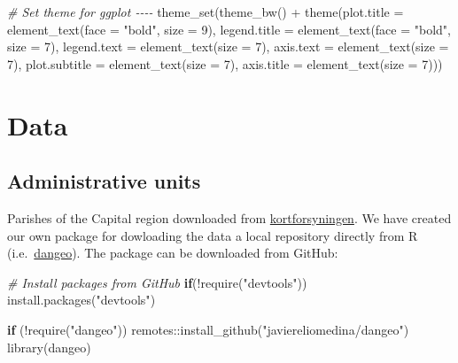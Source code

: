 \documentclass[
  12pt,
]{article}
\newenvironment{Shaded}{\begin{snugshade}}{\end{snugshade}}
\newcommand{\AttributeTok}[1]{\textcolor[rgb]{0.77,0.63,0.00}{#1}}
\newcommand{\CommentTok}[1]{\textcolor[rgb]{0.56,0.35,0.01}{\textit{#1}}}
\newcommand{\ControlFlowTok}[1]{\textcolor[rgb]{0.13,0.29,0.53}{\textbf{#1}}}
\newcommand{\DecValTok}[1]{\textcolor[rgb]{0.00,0.00,0.81}{#1}}
\newcommand{\FunctionTok}[1]{\textcolor[rgb]{0.00,0.00,0.00}{#1}}
\newcommand{\NormalTok}[1]{#1}
\newcommand{\SpecialCharTok}[1]{\textcolor[rgb]{0.00,0.00,0.00}{#1}}
\newcommand{\StringTok}[1]{\textcolor[rgb]{0.31,0.60,0.02}{#1}}
\begin{document}
\begin{Shaded}
\begin{Highlighting}[]
\CommentTok{\# Set theme for ggplot {-}{-}{-}{-}}
\FunctionTok{theme\_set}\NormalTok{(}\FunctionTok{theme\_bw}\NormalTok{() }\SpecialCharTok{+}
            \FunctionTok{theme}\NormalTok{(}\AttributeTok{plot.title =} \FunctionTok{element\_text}\NormalTok{(}\AttributeTok{face =} \StringTok{"bold"}\NormalTok{, }\AttributeTok{size =} \DecValTok{9}\NormalTok{),}
                  \AttributeTok{legend.title =} \FunctionTok{element\_text}\NormalTok{(}\AttributeTok{face =} \StringTok{"bold"}\NormalTok{, }\AttributeTok{size =} \DecValTok{7}\NormalTok{),}
                  \AttributeTok{legend.text =} \FunctionTok{element\_text}\NormalTok{(}\AttributeTok{size =} \DecValTok{7}\NormalTok{),}
                  \AttributeTok{axis.text =} \FunctionTok{element\_text}\NormalTok{(}\AttributeTok{size =} \DecValTok{7}\NormalTok{),}
                  \AttributeTok{plot.subtitle =} \FunctionTok{element\_text}\NormalTok{(}\AttributeTok{size =} \DecValTok{7}\NormalTok{),}
                  \AttributeTok{axis.title =} \FunctionTok{element\_text}\NormalTok{(}\AttributeTok{size =} \DecValTok{7}\NormalTok{)))}
\end{Highlighting}
\end{Shaded}

\hypertarget{data}{%
\section{Data}\label{data}}

\hypertarget{administrative-units}{%
\subsection{Administrative units}\label{administrative-units}}

Parishes of the Capital region downloaded from
\href{https://kortforsyningen.dk/}{kortforsyningen}. We have created our
own package for dowloading the data a local repository directly from R
(i.e.~\href{https://github.com/javiereliomedina/dangeo.git}{dangeo}).
The package can be downloaded from GitHub:

\begin{Shaded}
\begin{Highlighting}[]
\CommentTok{\# Install packages from GitHub}
\ControlFlowTok{if}\NormalTok{(}\SpecialCharTok{!}\FunctionTok{require}\NormalTok{(}\StringTok{"devtools"}\NormalTok{))  }\FunctionTok{install.packages}\NormalTok{(}\StringTok{"devtools"}\NormalTok{)}

\ControlFlowTok{if}\NormalTok{ (}\SpecialCharTok{!}\FunctionTok{require}\NormalTok{(}\StringTok{"dangeo"}\NormalTok{))  remotes}\SpecialCharTok{::}\FunctionTok{install\_github}\NormalTok{(}\StringTok{"javiereliomedina/dangeo"}\NormalTok{)}
\FunctionTok{library}\NormalTok{(dangeo)}
\end{Highlighting}
\end{Shaded}
\end{document}
